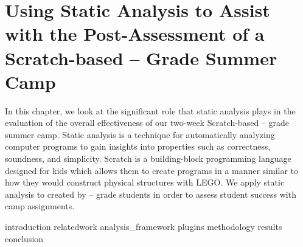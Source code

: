 \chapter{Using Static Analysis to Assist with the Post-Assessment of a
  Scratch-based -- Grade Summer Camp}
\label{chap:hairball}

In this chapter, we look at the significant role that static analysis plays in
the evaluation of the overall effectiveness of our two-week Scratch-based
-- grade summer camp. Static analysis is a technique for
automatically analyzing computer programs to gain insights into properties such
as correctness, soundness, and simplicity. Scratch is a building-block
programming language designed for kids which allows them to create programs in
a manner similar to how they would construct physical structures with
LEGO\textregistered{}. We apply static analysis to  created by
-- grade students in order to assess student success with camp
assignments.

\iffull
\def\currentprefix{hairball}
{introduction}
{relatedwork}
{analysis_framework}
{plugins}
{methodology}
{results}
{conclusion}
\fi
